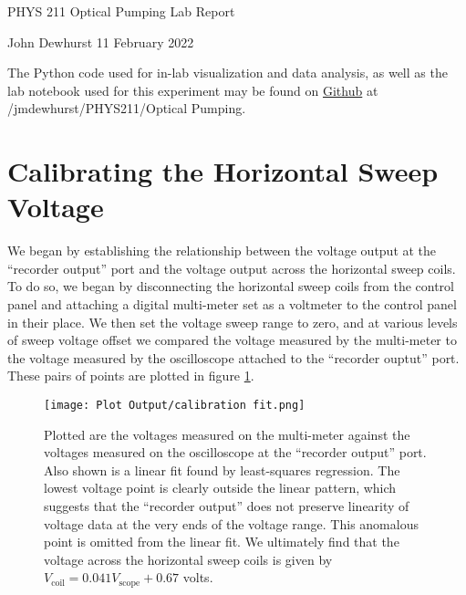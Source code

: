 \documentclass[letter]{article}
\begin{document}

\begin{center}
	{\large PHYS 211 Optical Pumping Lab Report}
	
	John Dewhurst \hspace{1cm}
	11 February 2022
	
	\vspace{1em}
	
	The Python code used for in-lab visualization and data analysis, as well as the lab notebook used for this experiment may be found on \href{https://github.com/jmdewhurst/PHYS211.git}{Github} at /jmdewhurst/PHYS211/Optical Pumping.
	
	\vspace{1em}
\end{center}
	

\section{Calibrating the Horizontal Sweep Voltage}

We began by establishing the relationship between the voltage output at the ``recorder output'' port and the voltage output across the horizontal sweep coils. To do so, we began by disconnecting the horizontal sweep coils from the control panel and attaching a digital multi-meter set as a voltmeter to the control panel in their place. We then set the voltage sweep range to zero, and at various levels of sweep voltage offset we compared the voltage measured by the multi-meter to the voltage measured by the oscilloscope attached to the ``recorder ouptut'' port. These pairs of points are plotted in figure \ref{fig:calibPlot}.

\begin{figure}[h] \centering
	\texttt{[image: Plot Output/calibration fit.png]}
	\caption{Plotted are the voltages measured on the multi-meter against the voltages measured on the oscilloscope at the ``recorder output'' port. Also shown is a linear fit found by least-squares regression. The lowest voltage point is clearly outside the linear pattern, which suggests that the ``recorder output'' does not preserve linearity of voltage data at the very ends of the voltage range. This anomalous point is omitted from the linear fit. We ultimately find that the voltage across the horizontal sweep coils is given by $V_{\text{coil}} = 0.041 V_{\text{scope}} + 0.67$ volts.}
	\label{fig:calibPlot}
\end{figure}
\end{document}
